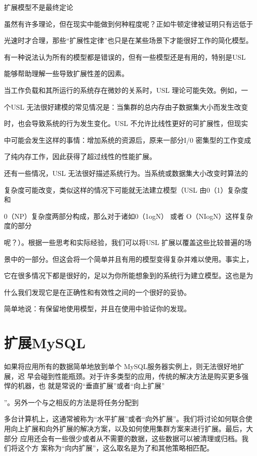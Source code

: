 扩展模型不是最终定论

虽然有许多理论，但在现实中能做到何种程度呢？正如牛顿定律被证明只有远低于

光速时才合理，那些“扩展性定律”也只是在某些场景下才能很好工作的简化模型。

有一种说法认为所有的模型都是错误的，但有一些模型还是有用的，特别是USL

能够帮助理解一些导致扩展性差的因素。

当工作负载和其所运行的系统存在微妙的关系时，USL 理论可能失效。例如，一

个USL 无法很好建模的常见情况是：当集群的总内存由子数据集大小而发生改变

时，也会导致系统的行为发生变化。USL 不允许比线性更好的可扩展性，但现实

中可能会发生这样的事情：增加系统的资源后，原来一部分I/0 密集型的工作变成

了纯内存工作，因此获得了超过线性的性能扩展。

还有一些情况，USL 无法很好描述系统行为。当系统或数据集大小改变时算法的

复杂度可能改变，类似这样的情况下可能就无法建立模型（USL 由0（1）复杂度和

0（NP）复杂度两部分构成，那么对于诸如0（1ogN） 或者 O（NIogN）这样复杂度的部分

呢？）。根据一些思考和实际经验，我们可以将USL 扩展以覆盖这些比较普遍的场

景中的一部分。但这会将一个简单并且有用的模型变得复杂并难以使用。事实上，

它在很多情况下都是很好的，足以为你所能想象到的系统行为建立模型。这也是为

什么我们发现它是在正确性和有效性之间的一个很好的妥协。

简单地说：有保留地使用模型，并且在使用中验证你的发现。

\section{扩展MySQL}
如果将应用所有的数据简单地放到单个 MySQL服务器实例上，则无法很好地扩展，迟
早会碰到性能瓶颈。对于许多类型的应用，传统的解决方法是购买更多强悍的机器，也
就是常说的“垂直扩展”或者“向上扩展”

”。另外一个与之相反的方法是将任务分配到

多台计算机上，这通常被称为“水平扩展”或者“向外扩展”。我们将讨论如何联合使
用向上扩展和向外扩展的解决方案，以及如何使用集群方案来进行扩展。最后，大部分
应用还会有一些很少或者从不需要的数据，这些数据可以被清理或归档。我们将这个方
案称为“向内扩展”，这么取名是为了和其他策略相匹配。

